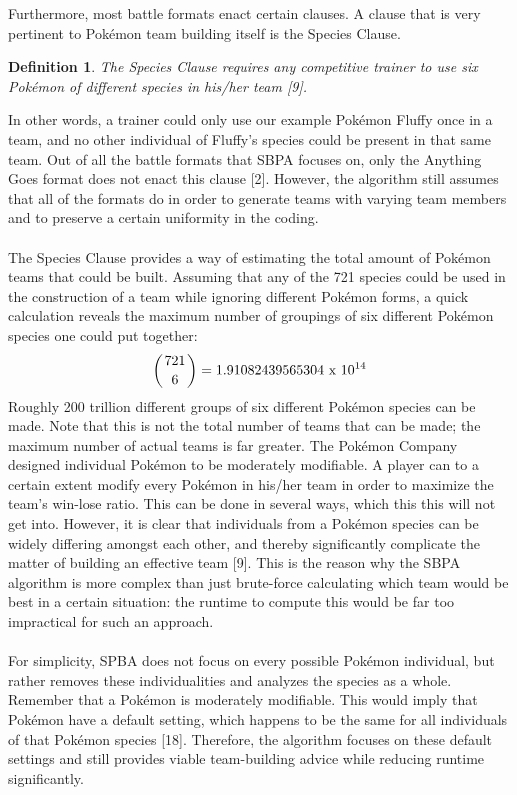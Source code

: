 \documentclass{article}
\newtheorem{definition}{Definition}
\begin{document}
Furthermore, most battle formats enact certain clauses. A clause that is very pertinent to Pok\'emon team building itself is the Species Clause.
\begin{definition}\label{SpeciesClause}
	The Species Clause requires any competitive trainer to use six Pok\'emon of different species in his/her team [9].
\end{definition}
In other words, a trainer could only use our example Pok\'emon Fluffy once in a team, and no other individual of Fluffy's species could be present in that same team. Out of all the battle formats that SBPA focuses on, only the Anything Goes format does not enact this clause [2]. However, the algorithm still assumes that all of the formats do in order to generate teams with varying team members and to preserve a certain uniformity in the coding.\\\\
The Species Clause provides a way of estimating the total amount of Pok\'emon teams that could be built. Assuming that any of the 721 species could be used in the construction of a team while ignoring different Pok\'emon forms, a quick calculation reveals the maximum number of groupings of six different Pok\'emon species one could put together:
\begin{equation*}
	\left({721 \above 0pt 6}\right)=1.91082439565304\text{ x }10^{14}
\end{equation*}
Roughly 200 trillion different groups of six different Pok\'emon species can be made. Note that this is not the total number of teams that can be made; the maximum number of actual teams is far greater. The Pok\'emon Company designed individual Pok\'emon to be moderately modifiable. A player can to a certain extent modify every Pok\'emon in his/her team in order to maximize the team's win-lose ratio. This can be done in several ways, which this this will not get into. However, it is clear that individuals from a Pok\'emon species can be widely differing amongst each other, and thereby significantly  complicate the matter of building an effective team [9]. This is the reason why the SBPA algorithm is more complex than just brute-force calculating which team would be best in a certain situation: the runtime to compute this would be far too impractical for such an approach.\\\\
For simplicity, SPBA does not focus on every possible Pok\'emon individual, but rather removes these individualities and analyzes the species as a whole. Remember that a Pok\'emon is moderately modifiable. This would imply that Pok\'emon have a default setting, which happens to be the same for all individuals of that Pok\'emon species [18]. Therefore, the algorithm focuses on these default settings and still provides viable team-building advice while reducing runtime significantly.\\\\
\end{document}
